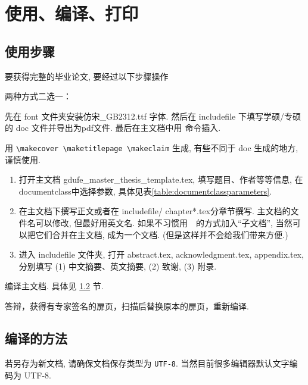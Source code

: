 \chapter{使用、编译、打印}
\section{使用步骤}

要获得完整的毕业论文, 要经过以下步骤操作
\begin{description}[labelsep = 1\ccwd]
    \item[封面、扉页、声明] 两种方式二选一：
            \begin{description}[labelindent = 2\ccwd, labelsep = 1\ccwd, leftmargin = !, itemindent = !]
                \item [PDF 插入] 先在 font 文件夹安装仿宋\_GB2312.ttf 字体. 然后在 includefile 下填写学硕/专硕的 doc 文件并导出为pdf文件. 最后在主文档中用 \verb|| 命令插入.
                \item [\LaTeX{}生成] 用 \verb|\makecover \maketitlepage \makeclaim| 生成, 有些不同于 doc 生成的地方, 谨慎使用.
            \end{description}

    \item[撰写] \quad
    \begin{enumerate}[left = 2\ccwd]
        \item  打开主文档 gdufe\_master\_thesis\_template.tex, 填写题目、作者等等信息, 在documentclass中选择参数, 具体见表\ref{table:documentclassparameters}.
        \item 在主文档下撰写正文或者在 includefile/ chapter*.tex分章节撰写. 主文档的文件名可以修改, 但最好用英文名. 如果不习惯用~\verb||~的方式加入``子文档'', 当然可以把它们合并在主文档, 成为一个文档. ({\kaishu 但是这样并不会给我们带来方便.})
        \item 进入 includefile 文件夹,  打开 abstract.tex, acknowledgment.tex, appendix.tex, 分别填写 (1) 中文摘要、英文摘要, (2) 致谢, (3) 附录.
    \end{enumerate}


    \item[编译] 编译主文档. 具体见 \ref{sec-compile} 节.
    \item[再次编译] 答辩，获得有专家签名的扉页，扫描后替换原本的扉页，重新编译.
\end{description}

\section{编译的方法}\label{sec-compile}
若另存为新文档, 请确保文档保存类型为 \verb|UTF-8|. 当然目前很多编辑器默认文字编码为 UTF-8.

